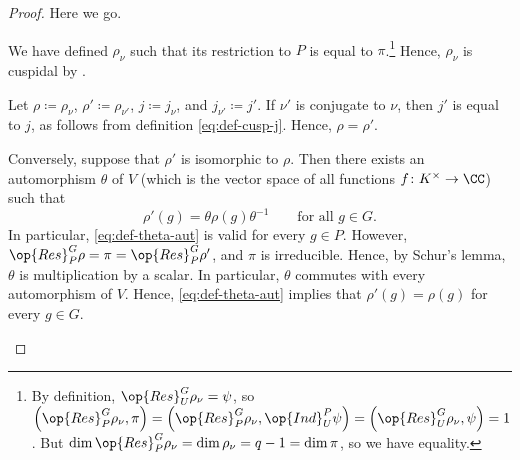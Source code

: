 \documentclass[../main.tex]{subfiles}
\begin{document}
\begin{proof}
	Here we go.
	\begin{listalph}
		\item We have defined $\rho_\nu$ such that its restriction to $P$ is equal to $\pi$.\footnote{By definition, $\op{Res}^G_U\rho_\nu=\psi$, so $\left(\op{Res}^G_P\rho_\nu,\pi\right)=\left(\op{Res}^G_P\rho_\nu,\op{Ind}_U^P\psi\right)=\left(\op{Res}^G_U\rho_\nu,\psi\right)=1$. But $\dim\op{Res}^G_P\rho_\nu=\dim\rho_\nu=q-1=\dim\pi$, so we have equality.} Hence, $\rho_\nu$ is cuspidal by .
		\item Let $\rho\coloneqq\rho_\nu$, $\rho'\coloneqq\rho_{\nu'}$, $j\coloneqq j_\nu$, and $j_{\nu'}\coloneqq j'$. If $\nu'$ is conjugate to $\nu$, then $j'$ is equal to $j$, as follows from definition \eqref{eq:def-cusp-j}. Hence, $\rho=\rho'$.

		Conversely, suppose that $\rho'$ is isomorphic to $\rho$. Then there exists an automorphism $\theta$ of $V$ (which is the vector space of all functions $f\colon K^\times\to\CC$) such that
		\begin{equation}
			\rho'(g)=\theta\rho(g)\theta^{-1}\qquad\text{for all }g\in G. \label{eq:def-theta-aut}
		\end{equation}
		In particular, \eqref{eq:def-theta-aut} is valid for every $g\in P$. However, $\op{Res}^G_P\rho=\pi=\op{Res}^G_P\rho'$, and $\pi$ is irreducible. Hence, by Schur's lemma, $\theta$ is multiplication by a scalar. In particular, $\theta$ commutes with every automorphism of $V$. Hence, \eqref{eq:def-theta-aut} implies that $\rho'(g)=\rho(g)$ for every $g\in G$.


\end{listalph}
\end{proof}
\end{document}
